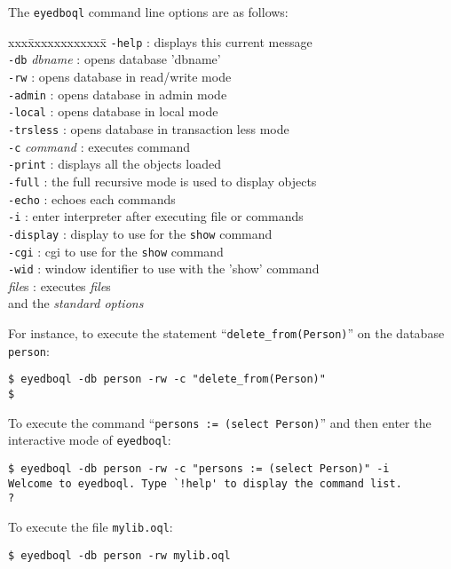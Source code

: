 The \texttt{eyedboql} command line options are as follows:
\begin{tabbing}
xxx\=xxxxxxxxxxxx\=\kill
\> \texttt{-help}       \> : displays this current message\\
\> \texttt{-db} \emph{dbname}\> : opens database 'dbname'\\
\> \texttt{-rw}         \> : opens database in read/write mode\\
\> \texttt{-admin}      \> : opens database in admin mode\\
\> \texttt{-local}      \> : opens database in local mode\\
\> \texttt{-trsless}    \> : opens database in transaction less mode\\
\> \texttt{-c} \emph{command}\> : executes command\\
\> \texttt{-print}      \> : displays all the objects loaded\\
\> \texttt{-full}       \> : the full recursive mode is used to display objects\\
\> \texttt{-echo}       \> : echoes each commands\\
\> \texttt{-i}          \> : enter interpreter after executing file or commands\\
\> \texttt{-display}    \> : display to use for the \texttt{show} command\\
\> \texttt{-cgi}        \> : cgi to use for the \texttt{show} command\\
\> \texttt{-wid}        \> : window identifier to use with the 'show' command\\
\> \emph{file}s      \> : executes \emph{file}s\\
\> and the \emph{\eyedb standard options}\\
\end{tabbing}
For instance, to execute the statement ``\texttt{delete\_from(Person)}''
on the database \texttt{person}:
\begin{verbatim}
$ eyedboql -db person -rw -c "delete_from(Person)"
$
\end{verbatim}
To execute the command ``\texttt{persons := (select Person)}'' and then
enter the interactive mode of \texttt{eyedboql}:
\begin{verbatim}
$ eyedboql -db person -rw -c "persons := (select Person)" -i
Welcome to eyedboql. Type `!help' to display the command list.
?
\end{verbatim}
To execute the file \texttt{mylib.oql}:
\begin{verbatim}
$ eyedboql -db person -rw mylib.oql
\end{verbatim}


